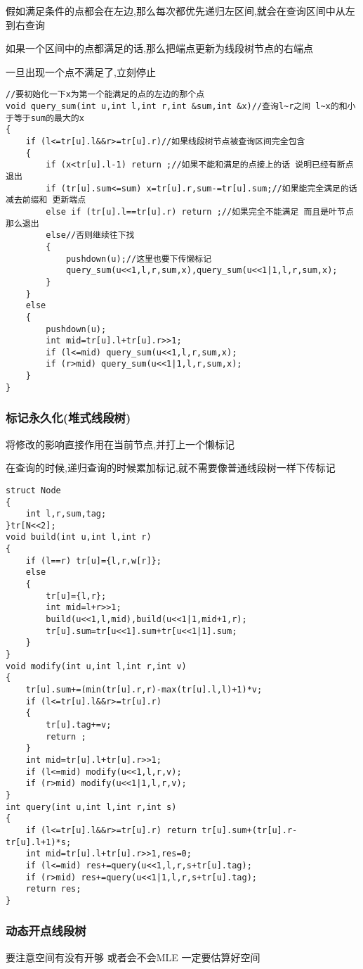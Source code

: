 \documentclass[a4paper]{ctexart}
\begin{document}
假如满足条件的点都会在左边,那么每次都优先递归左区间,就会在查询区间中从左到右查询

如果一个区间中的点都满足的话,那么把端点更新为线段树节点的右端点

一旦出现一个点不满足了,立刻停止
\begin{lstlisting}
//要初始化一下x为第一个能满足的点的左边的那个点
void query_sum(int u,int l,int r,int &sum,int &x)//查询l~r之间 l~x的和小于等于sum的最大的x
{
	if (l<=tr[u].l&&r>=tr[u].r)//如果线段树节点被查询区间完全包含
	{
		if (x<tr[u].l-1) return ;//如果不能和满足的点接上的话 说明已经有断点 退出
		if (tr[u].sum<=sum) x=tr[u].r,sum-=tr[u].sum;//如果能完全满足的话 减去前缀和 更新端点
		else if (tr[u].l==tr[u].r) return ;//如果完全不能满足 而且是叶节点 那么退出
		else//否则继续往下找
		{
			pushdown(u);//这里也要下传懒标记
			query_sum(u<<1,l,r,sum,x),query_sum(u<<1|1,l,r,sum,x);
		}
	}
	else
	{
		pushdown(u);
		int mid=tr[u].l+tr[u].r>>1;
		if (l<=mid) query_sum(u<<1,l,r,sum,x);
		if (r>mid) query_sum(u<<1|1,l,r,sum,x);
	}
}
\end{lstlisting}

\subsubsection{标记永久化(堆式线段树)}
将修改的影响直接作用在当前节点,并打上一个懒标记

在查询的时候,递归查询的时候累加标记,就不需要像普通线段树一样下传标记
\begin{lstlisting}
struct Node
{
	int l,r,sum,tag;
}tr[N<<2];
void build(int u,int l,int r)
{
	if (l==r) tr[u]={l,r,w[r]};
	else
	{
		tr[u]={l,r};
		int mid=l+r>>1;
		build(u<<1,l,mid),build(u<<1|1,mid+1,r);
		tr[u].sum=tr[u<<1].sum+tr[u<<1|1].sum;
	}
}
void modify(int u,int l,int r,int v)
{
	tr[u].sum+=(min(tr[u].r,r)-max(tr[u].l,l)+1)*v;
	if (l<=tr[u].l&&r>=tr[u].r)
	{
		tr[u].tag+=v;
		return ;
	}
	int mid=tr[u].l+tr[u].r>>1;
	if (l<=mid) modify(u<<1,l,r,v);
	if (r>mid) modify(u<<1|1,l,r,v);
}
int query(int u,int l,int r,int s)
{
	if (l<=tr[u].l&&r>=tr[u].r) return tr[u].sum+(tr[u].r-tr[u].l+1)*s;
	int mid=tr[u].l+tr[u].r>>1,res=0;
	if (l<=mid) res+=query(u<<1,l,r,s+tr[u].tag);
	if (r>mid) res+=query(u<<1|1,l,r,s+tr[u].tag);
	return res;
}
\end{lstlisting}

\subsubsection{动态开点线段树}
要注意空间有没有开够 或者会不会MLE  一定要估算好空间
\end{document}
